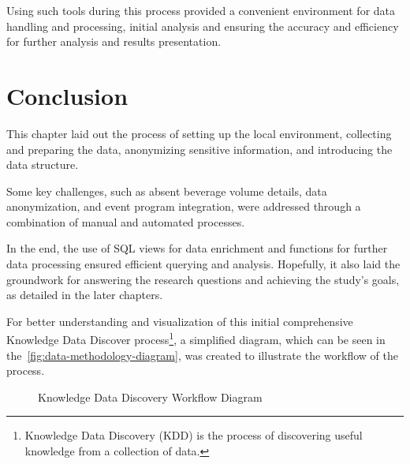 Using such tools during this process provided a convenient environment for data handling and processing, initial analysis and ensuring the accuracy and efficiency for further analysis and results presentation.

\pagebreak[4]


\section{Conclusion}
\label{sec:data-methodology-conclusion}
This chapter laid out the process of setting up the local environment, collecting and preparing the data, anonymizing sensitive information, and introducing the data structure.

Some key challenges, such as absent beverage volume details, data anonymization, and event program integration, were addressed through a combination of manual and automated processes.

In the end, the use of SQL views for data enrichment and functions for further data processing ensured efficient querying and analysis.
Hopefully, it also laid the groundwork for answering the research questions and achieving the study's goals, as detailed in the later chapters.

For better understanding and visualization of this initial comprehensive Knowledge Data Discover process\footnote{Knowledge Data Discovery (KDD) is the process of discovering useful knowledge from a collection of data\cite{uord_kdd_1_kdd}.}, a simplified diagram, which can be seen in the~\autoref{fig:data-methodology-diagram}, was created to illustrate the workflow of the process.

\begin{figure}[h]
	\centering
	
	\caption{Knowledge Data Discovery Workflow Diagram}
	\label{fig:data-methodology-diagram}
\end{figure}
